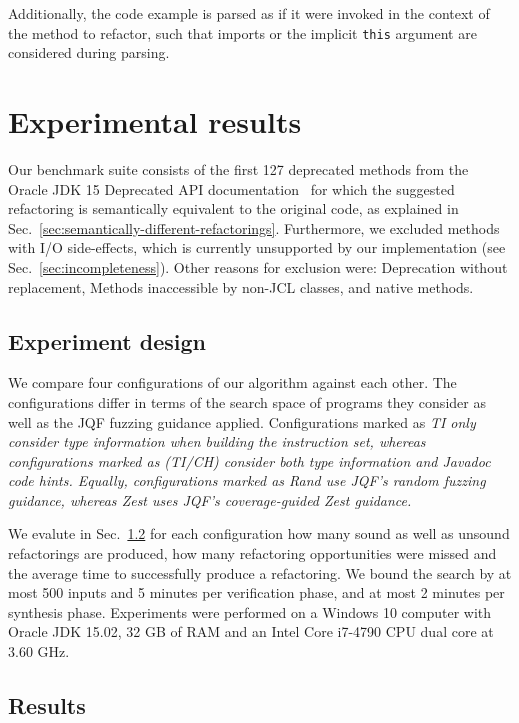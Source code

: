 \documentclass[sigconf,review,anonymous]{acmart}
\begin{document}
Additionally, the code example is parsed as if it were invoked in the context of
the method to refactor, such that imports or the implicit \texttt{this} argument
are considered during parsing.

\section{Experimental results}\label{sec:experimental-results}
Our benchmark suite consists of the first 127 deprecated methods from the Oracle
JDK 15 Deprecated API documentation~\cite{OracleJdk15DeprecatedAPI} for which
the suggested refactoring is semantically equivalent to the original code, as
explained in Sec.~\ref{sec:semantically-different-refactorings}.
Furthermore, we excluded methods with I/O side-effects, which is currently
unsupported by our implementation (see Sec.~\ref{sec:incompleteness}). Other
reasons for exclusion were: Deprecation without replacement, Methods
inaccessible by non-JCL classes, and native methods.

\subsection{Experiment design}
We compare four configurations of our algorithm against each other. The
configurations differ in terms of the search space of programs they consider
as well as the JQF fuzzing guidance applied. Configurations marked as \em{TI}
only consider type information when building the instruction set, whereas
configurations marked as (\em{TI/CH}) consider both type information and Javadoc
code hints. Equally, configurations marked as \em{Rand} use JQF's random fuzzing
guidance, whereas \em{Zest} uses JQF's coverage-guided Zest guidance.

We evalute in Sec.~\ref{sec:experimental-results} for each configuration how
many sound as well as unsound refactorings are produced, how many refactoring
opportunities were missed and the average time to successfully produce a
refactoring. We bound the search by at most 500 inputs and 5 minutes per verification
phase, and at most 2 minutes per synthesis phase. Experiments were performed on
a Windows 10 computer with Oracle JDK 15.02, 32 GB of RAM and an Intel Core
i7-4790 CPU dual core at 3.60 GHz.

\subsection{Results}\label{sec:experimental-results}
\end{document}

